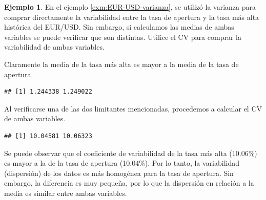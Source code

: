 \documentclass[
  11pt,
]{book}
\newenvironment{Shaded}{\begin{snugshade}}{\end{snugshade}}
\newcommand{\DecValTok}[1]{\textcolor[rgb]{0.00,0.00,0.81}{#1}}
\newcommand{\FunctionTok}[1]{\textcolor[rgb]{0.13,0.29,0.53}{\textbf{#1}}}
\newcommand{\NormalTok}[1]{#1}
\newcommand{\OtherTok}[1]{\textcolor[rgb]{0.56,0.35,0.01}{#1}}
\newcommand{\SpecialCharTok}[1]{\textcolor[rgb]{0.81,0.36,0.00}{\textbf{#1}}}
\theoremstyle{definition}
\theoremstyle{definition}
\newtheorem{example}{Ejemplo}[chapter]
\theoremstyle{definition}
\theoremstyle{definition}
\theoremstyle{remark}
\begin{document}
\begin{example}
En el ejemplo \ref{exm:EUR-USD-varianza}, se utilizó la varianza para comprar directamente la variabilidad entre la tasa de apertura y la tasa más alta histórica del EUR/USD. Sin embargo, si calculamos las medias de ambas variables se puede verificar que son distintas. Utilice el CV para comprar la variabilidad de ambas variables.

Claramente la media de la tasa más alta es mayor a la media de la tasa de apertura.

\begin{Shaded}
\end{Shaded}

\begin{verbatim}
## [1] 1.244338 1.249022
\end{verbatim}

Al verificarse una de las dos limitantes mencionadas, procedemos a calcular el CV de ambas variables.

\begin{Shaded}
\end{Shaded}

\begin{verbatim}
## [1] 10.04581 10.06323
\end{verbatim}

Se puede observar que el coeficiente de variabilidad de la tasa más alta (10.06\%) es mayor a la de la tasa de apertura (10.04\%). Por lo tanto, la variabilidad (dispersión) de los datos es más homogénea para la tasa de apertura. Sin embargo, la diferencia es muy pequeña, por lo que la dispersión en relación a la media es similar entre ambas variables.
\end{example}
\end{document}

